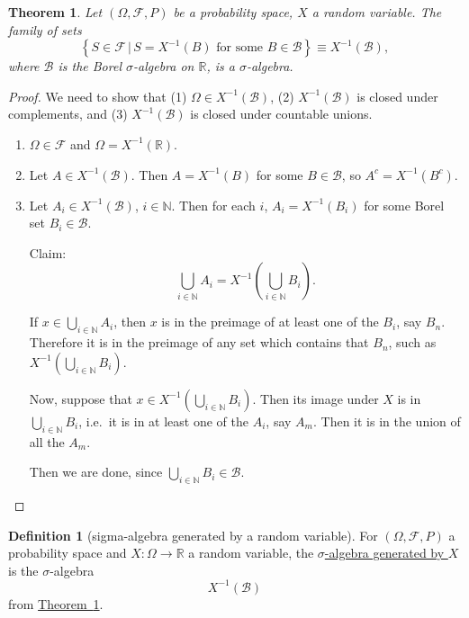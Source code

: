 \documentclass[a4paper]{scrartcl}
\newcommand{\R}{\mathbb{R}}
\newcommand{\N}{\mathbb{N}}
\newcommand{\defn}[1]{\ul{#1}}
\theoremstyle{definition}
\newtheorem{definition}{Definition}[section]
\theoremstyle{plain}
\newtheorem{theorem}{Theorem}[section]
\theoremstyle{remark}
\begin{document}
\begin{theorem}
  \label{thm:preimageofsigmaalgebraissigmaalgebra}
  Let $(\Omega, \mathcal{F}, P)$ be a probability space, $X$ a random variable. The family of sets
  \begin{equation*}
    \left\{ S \in \mathcal{F}\,\big|\, S = X^{-1}(B)\text{ for some }B \in \mathcal{B} \right\} \equiv X^{-1}(\mathcal{B}),
  \end{equation*}
  where $\mathcal{B}$ is the Borel $\sigma$-algebra on $\R$, is a $\sigma$-algebra.
\end{theorem}
\begin{proof}
  We need to show that (1) $\Omega \in X^{-1}(\mathcal{B})$, (2) $X^{-1}(\mathcal{B})$ is closed under complements, and (3) $X^{-1}(\mathcal{B})$ is closed under countable unions.
  \begin{enumerate}
    \item $\Omega \in \mathcal{F}$ and $\Omega = X^{-1}(\R)$.

    \item Let $A \in X^{-1}(\mathcal{B})$. Then $A = X^{-1}(B)$ for some $B \in \mathcal{B}$, so $A^{c} = X^{-1}(B^{c})$.

    \item Let $A_{i} \in X^{-1}(\mathcal{B})$, $i \in \N$. Then for each $i$, $A_{i} = X^{-1}(B_{i})$ for some Borel set $B_{i} \in \mathcal{B}$.

      Claim:
      \begin{equation*}
        \bigcup_{i \in \N} A_{i} = X^{-1}\left( \bigcup_{i \in \N} B_{i} \right).
      \end{equation*}

      If $x \in \bigcup_{i \in \N} A_{i}$, then $x$ is in the preimage of at least one of the $B_{i}$, say $B_{n}$. Therefore it is in the preimage of any set which contains that $B_{n}$, such as $X^{-1}\left( \bigcup_{i \in \N}B_{i} \right)$.

      Now, suppose that $x \in X^{-1}\left( \bigcup_{i \in \N} B_{i} \right)$. Then its image under $X$ is in $\bigcup_{i \in \N} B_{i}$, i.e.\ it is in at least one of the $A_{i}$, say $A_{m}$. Then it is in the union of all the $A_{m}$.

      Then we are done, since $\bigcup_{i \in \N} B_{i} \in \mathcal{B}$.
  \end{enumerate}
\end{proof}

\begin{definition}[sigma-algebra generated by a random variable]
  \label{def:sigmaalgebrageneratedbyarandomvariable}
  For $(\Omega, \mathcal{F}, P)$ a probability space and $X\colon \Omega \to \R$ a random variable, the \defn{$\sigma$-algebra generated by $X$} is the $\sigma$-algebra
  \begin{equation*}
    X^{-1}(\mathcal{B})
  \end{equation*}
  from \hyperref[thm:preimageofsigmaalgebraissigmaalgebra]{Theorem~\ref*{thm:preimageofsigmaalgebraissigmaalgebra}}.
\end{definition}
\end{document}
